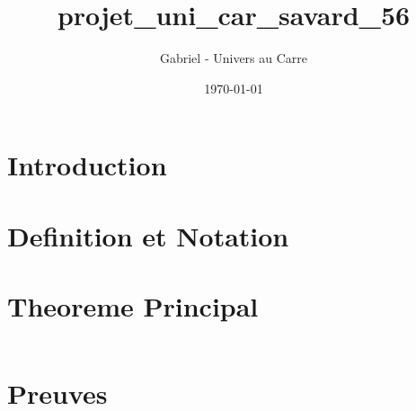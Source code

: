 \documentclass[12pt]{article}
\title{projet_uni_car_savard_56}
\author{Gabriel - Univers au Carre}
\date{\today}
\begin{document}
\maketitle


\section{Introduction}



\section{Definition et Notation}



\section{Theoreme Principal}


\begin{equation}
\end{equation}


\section{Preuves}


\end{document}
